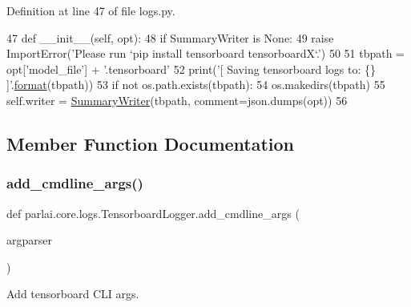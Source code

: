 Definition at line 47 of file logs.\+py.


\begin{DoxyCode}
47     \textcolor{keyword}{def }\_\_init\_\_(self, opt):
48         \textcolor{keywordflow}{if} SummaryWriter \textcolor{keywordflow}{is} \textcolor{keywordtype}{None}:
49             \textcolor{keywordflow}{raise} ImportError(\textcolor{stringliteral}{'Please run `pip install tensorboard tensorboardX`.'})
50 
51         tbpath = opt[\textcolor{stringliteral}{'model\_file'}] + \textcolor{stringliteral}{'.tensorboard'}
52         print(\textcolor{stringliteral}{'[ Saving tensorboard logs to: \{\} ]'}.\hyperlink{namespaceparlai_1_1chat__service_1_1services_1_1messenger_1_1shared__utils_a32e2e2022b824fbaf80c747160b52a76}{format}(tbpath))
53         \textcolor{keywordflow}{if} \textcolor{keywordflow}{not} os.path.exists(tbpath):
54             os.makedirs(tbpath)
55         self.writer = \hyperlink{namespaceparlai_1_1core_1_1logs_a214c91224d7834e7962d77d49f17bbc4}{SummaryWriter}(tbpath, comment=json.dumps(opt))
56 
\end{DoxyCode}


\subsection{Member Function Documentation}
\mbox{\label{classparlai_1_1core_1_1logs_1_1TensorboardLogger_a22488a4b41a75dce0a1c467418882e83}} 
\subsubsection{\texorpdfstring{add\+\_\+cmdline\+\_\+args()}{add\_cmdline\_args()}}
{\footnotesize\ttfamily def parlai.\+core.\+logs.\+Tensorboard\+Logger.\+add\+\_\+cmdline\+\_\+args (\begin{DoxyParamCaption}\item[{}]{argparser }\end{DoxyParamCaption})\hspace{0.3cm}{\ttfamily [static]}}

\begin{DoxyVerb}Add tensorboard CLI args.
\end{DoxyVerb}
 

